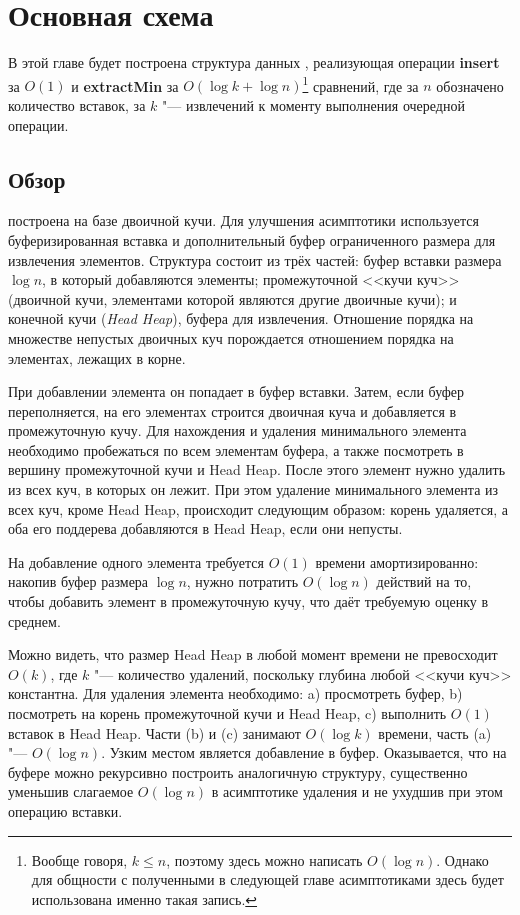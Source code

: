 \chapter{Основная схема} \label{chapt-sch}

В этой главе будет построена структура данных \SCH, реализующая операции \textbf{insert}
за $O(1)$ и \textbf{extractMin} за $O(\log k + \log n)$\footnote{
    Вообще говоря, $k\leq n$, поэтому здесь можно написать $O(\log n)$.
Однако для общности с полученными в следующей главе асимптотиками
здесь будет использована именно такая запись.}
сравнений, где
за $n$ обозначено количество вставок, за $k$ "--- извлечений к моменту выполнения
очередной операции.

\section{Обзор}
\SCH построена на базе двоичной кучи. Для улучшения
асимптотики используется буферизированная вставка и дополнительный буфер
ограниченного размера для извлечения элементов. Структура состоит из трёх
частей: буфер вставки размера $\log n$, в который добавляются элементы; промежуточной
<<кучи куч>> (двоичной кучи, элементами которой являются другие двоичные кучи);
и конечной кучи (\emph{Head Heap}), буфера для извлечения. Отношение порядка
на множестве непустых двоичных куч порождается отношением порядка на элементах,
лежащих в корне.

При добавлении элемента он попадает в буфер вставки. Затем, если буфер переполняется,
на его элементах строится двоичная куча и добавляется в промежуточную кучу.
Для нахождения и удаления минимального элемента необходимо пробежаться по всем
элементам буфера, а также посмотреть в вершину промежуточной кучи и Head Heap.
После этого элемент нужно удалить из всех куч, в которых он лежит. При этом
удаление минимального элемента из всех куч, кроме Head Heap, происходит следующим образом:
корень удаляется, а оба его поддерева добавляются в Head Heap, если они непусты.

На добавление одного элемента требуется $O(1)$ времени амортизированно: накопив
буфер размера $\log n$, нужно потратить $O(\log n)$ действий на то, чтобы добавить
элемент в промежуточную кучу, что даёт требуемую оценку в среднем.

Можно видеть, что размер Head Heap в любой момент времени не превосходит $O(k)$, где
$k$ "--- количество удалений, поскольку глубина любой <<кучи куч>> константна.
Для удаления элемента необходимо: a) просмотреть буфер, b) посмотреть
на корень промежуточной кучи и Head Heap, c) выполнить $O(1)$ вставок в Head Heap.
Части (b) и (c) занимают $O(\log k)$ времени, часть (a) "--- $O(\log n)$.
Узким местом является добавление в буфер. Оказывается, что на буфере можно
рекурсивно построить аналогичную структуру, существенно уменьшив слагаемое
$O(\log n)$ в асимптотике удаления и не ухудшив при этом операцию вставки.

